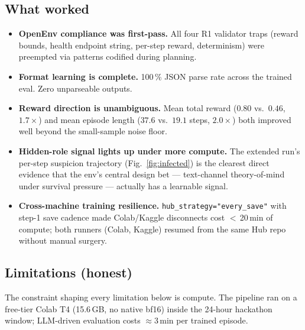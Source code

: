 \documentclass[11pt,a4paper]{article}
\begin{document}
\subsection{What worked}
\begin{itemize}[leftmargin=*]
  \item \textbf{OpenEnv compliance was first-pass.} All four R1 validator
        traps (reward bounds, health endpoint string, per-step reward,
        determinism) were preempted via patterns codified during planning.
  \item \textbf{Format learning is complete.} 100\,\% JSON parse rate
        across the trained eval. Zero unparseable outputs.
  \item \textbf{Reward direction is unambiguous.} Mean total reward
        ($0.80$ vs.\ $0.46$, $1.7\!\times$) and mean episode length
        ($37.6$ vs.\ $19.1$ steps, $2.0\!\times$) both improved well
        beyond the small-sample noise floor.
  \item \textbf{Hidden-role signal lights up under more compute.} The
        extended run's per-step suspicion trajectory (Fig.~\ref{fig:infected})
        is the clearest direct evidence that the env's central design
        bet --- text-channel theory-of-mind under survival pressure ---
        actually has a learnable signal.
  \item \textbf{Cross-machine training resilience.}
        \texttt{hub\_strategy="every\_save"} with step-1 save cadence made
        Colab/Kaggle disconnects cost $<$\,20\,min of compute; both
        runners (Colab, Kaggle) resumed from the same Hub repo without
        manual surgery.
\end{itemize}

\subsection{Limitations (honest)}
\label{sec:limitations}

The constraint shaping every limitation below is compute. The pipeline
ran on a free-tier Colab T4 (15.6\,GB, no native bf16) inside the
24-hour hackathon window; LLM-driven evaluation costs $\approx$3\,min
per trained episode.
\end{document}

